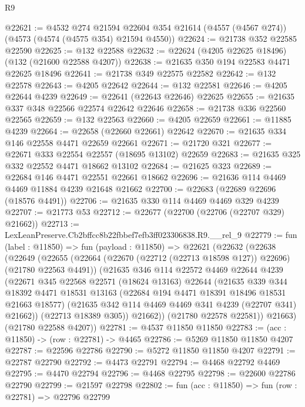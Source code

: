 \begin{lexlean}{R9}
\begin{coremodule}
@22621 := @4532
    @274
    @21594
    @22604
    @354
    @21614
    (@4557 (@4567 @274))
    (@4573 (@4574 (@4575 @354) @21594 @4550))
@22624 := @21738 @352 @22585 @22590
@22625 := @132 @22588
@22632 := @22624 (@4205 @22625 @18496) (@132 (@21600 @22588 @4207))
@22638 := @21635 @350 @194 @22583 @4471 @22625 @18496
@22641 := @21738 @349 @22575 @22582
@22642 := @132 @22578
@22643 := @4205 @22642
@22644 := @132 @22581
@22646 := @4205 @22644 @4239
@22649 := @22641 (@22643 @22646) @22625
@22655 := @21635 @337 @348 @22566 @22574 @22642 @22646
@22658 := @21738 @336 @22560 @22565
@22659 := @132 @22563
@22660 := @4205 @22659
@22661 := @11885 @4239
@22664 := @22658 (@22660 @22661) @22642
@22670 := @21635 @334 @146 @22558 @4471 @22659 @22661
@22671 := @21720 @321
@22677 := @22671 @333 @22554 @22557 (@18695 @13102) @22659
@22683 := @21635 @325 @332 @22552 @4471 @18662 @13102
@22684 := @21625 @323
@22689 := @22684 @146 @4471 @22551 @22661 @18662
@22696 := @21636 @114 @4469 @4469 @11884 @4239 @21648 @21662
@22700 := @22683 (@22689 @22696 (@18576 @4491))
@22706 := @21635 @330 @114 @4469 @4469 @329 @4239
@22707 := @21773 @53
@22712 := @22677 (@22700 (@22706 (@22707 @329) @21662))
@22713 := LexLeanPreserve.Cb2bffcc8b22fbbef7efb3ff023306838.R9.__rel_9
@22779 := fun (label : @11850) =>
  fun (payload : @11850) =>
  @22621
    (@22632
      (@22638
        (@22649
          (@22655
            (@22664 (@22670 (@22712 (@22713 @18598 @127)) @22696) (@21780 @22563 @4491))
            (@21635
              @346
              @114
              @22572
              @4469
              @22644
              @4239
              (@22671
                @345
                @22568
                @22571
                (@18624 @13163)
                @22644
                (@21635
                  @339
                  @344
                  @18392
                  @4471
                  @18531
                  @13163
                  (@22684 @194 @4471 @18391 @18496 @18531 @21663 @18577)
                  (@21635 @342 @114 @4469 @4469 @341 @4239 (@22707 @341) @21662))
                (@22713 @18389 @305))
              @21662))
          (@21780 @22578 @22581))
        @21663)
      (@21780 @22588 @4207))
@22781 := @4537 @11850 @11850
@22783 := (acc : @11850) -> (row : @22781) -> @4465
@22786 := @5269 @11850 @11850 @4207
@22787 := @22596 @22786
@22790 := @5272 @11850 @11850 @4207
@22791 := @22787 @22790
@22792 := @4473 @22791
@22794 := @4468 @22792 @4469
@22795 := @4470 @22794
@22796 := @4468 @22795
@22798 := @22600 @22786 @22790
@22799 := @21597 @22798
@22802 := fun (acc : @11850) => fun (row : @22781) => @22796 @22799

\end{coremodule}
\end{lexlean}

